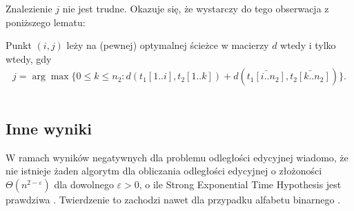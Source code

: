 Znalezienie $j$ nie jest trudne. Okazuje się, że wystarczy do tego obserwacja z poniższego lematu:
\begin{problem}{}{}
  Punkt $(i, j)$ leży na (pewnej) optymalnej ścieżce w macierzy $d$ wtedy i tylko wtedy, gdy
  \begin{align*}
      j = \arg\max \{0 \le k \le n_2: d(t_1[1..i], t_2[1..k]) + d(\bar{t_1[i..n_2]}, \bar{t_2[k..n_2]})\}.
  \end{align*}
\end{problem}

\begin{code}
\inputminted{python}{code/approximate-string-matching/hirschberg.py}
\label{alg:lcs-hirschberg}
\end{code}

\subsection{Inne wyniki}

W ramach wyników negatywnych dla problemu odległości edycyjnej wiadomo, że nie istnieje żaden algorytm dla obliczania odległości edycyjnej o złożoności $\Theta(n^{2 - \varepsilon})$ dla dowolnego $\varepsilon > 0$, o ile Strong Exponential Time Hypothesis jest prawdziwa \citep{backurs2015edit}. Twierdzenie to zachodzi nawet dla przypadku alfabetu binarnego \citep{bringmann2015quadratic}.
